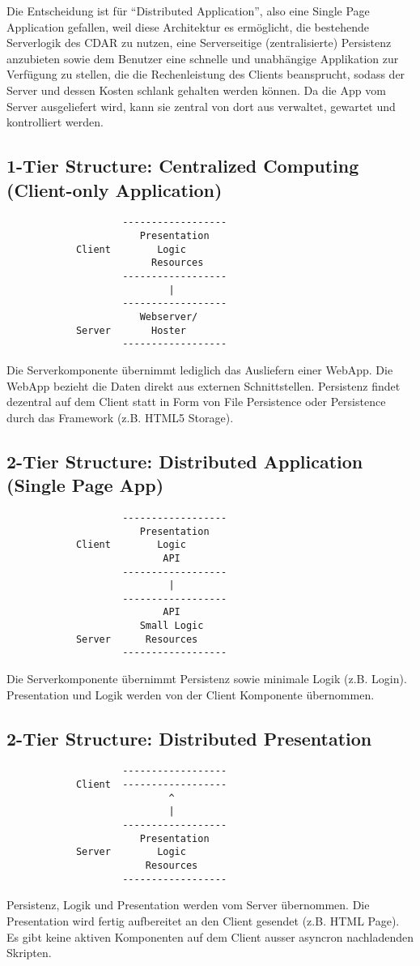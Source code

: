 		Die Entscheidung ist für "`Distributed Application"', also eine Single Page Application gefallen, 
		weil diese Architektur es ermöglicht, die bestehende Serverlogik des CDAR zu nutzen, 
		eine Serverseitige (zentralisierte) Persistenz anzubieten sowie dem Benutzer eine schnelle und unabhängige Applikation zur Verfügung zu stellen, die die Rechenleistung des Clients beansprucht, sodass der Server und dessen Kosten schlank gehalten werden können.
		Da die App vom Server ausgeliefert wird, kann sie zentral von dort aus verwaltet, gewartet und kontrolliert werden.
		
		\subsection{1-Tier Structure: Centralized Computing (Client-only Application)}
			\begin{verbatim}
			        ------------------
			           Presentation
			Client        Logic
			             Resources
			        ------------------
			                |
			        ------------------
			           Webserver/
			Server       Hoster	
			        ------------------		
			\end{verbatim}

			Die Serverkomponente übernimmt lediglich das Ausliefern einer WebApp. 
			Die WebApp bezieht die Daten direkt aus externen Schnittstellen. 
			Persistenz findet dezentral auf dem Client statt in Form von File Persistence oder 
			Persistence durch das Framework (z.B. HTML5 Storage).
	
		\subsection{2-Tier Structure: Distributed Application (Single Page App)}
			\begin{verbatim}
			        ------------------
			           Presentation
			Client        Logic
			               API
			        ------------------
			                |
			        ------------------
			               API
			           Small Logic
			Server      Resources
			        ------------------		
			\end{verbatim}
			Die Serverkomponente übernimmt Persistenz sowie minimale Logik (z.B. Login).
			Presentation und Logik werden von der Client Komponente übernommen.
			
		\subsection{2-Tier Structure: Distributed Presentation}
			\begin{verbatim}
			        ------------------
			Client  ------------------   
			                ^
			                |
			        ------------------
			           Presentation
			Server        Logic
			            Resources
			        ------------------		
			\end{verbatim}
			Persistenz, Logik und Presentation werden vom Server übernommen.
			Die Presentation wird fertig aufbereitet an den Client gesendet (z.B. HTML Page).
			Es gibt keine aktiven Komponenten auf dem Client ausser asyncron nachladenden Skripten.
			
			
		

